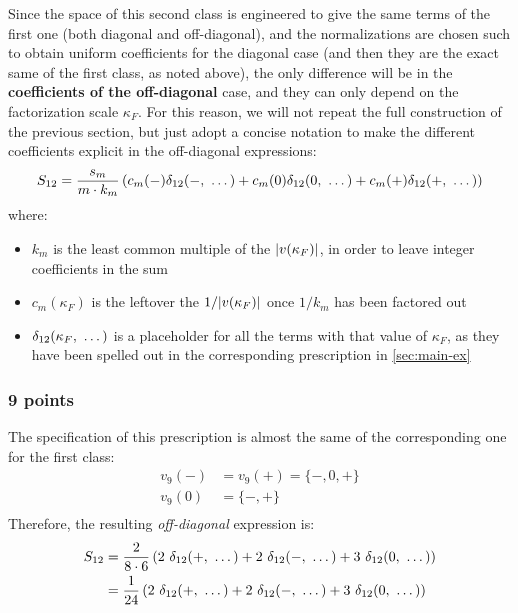 Since the space of this second class is engineered to give the same terms of
the first one (both diagonal and off-diagonal), and the normalizations are
chosen such to obtain uniform coefficients for the diagonal case (and then they
are the exact same of the first class, as noted above), the only difference
will be in the \textbf{coefficients of the off-diagonal} case, and they can
only depend on the factorization scale $\kappa_F$.
For this reason, we will not repeat the full construction of the previous
section, but just adopt a concise notation to make the different coefficients
explicit in the off-diagonal expressions:
\begin{equation}
    S_{12} = \frac{s_m}{m \cdot k_m} \left(c_m(-) \delta_{12}(-,\ \dots) +
        c_m(0) \delta_{12}(0,\ \dots) + c_m(+) \delta_{12}(+,\ \dots)\right)
\end{equation}
where:
\begin{itemize}
    \item $k_m$ is the least common multiple of the $\abs{v(\kappa_F)}$, in
        order to leave integer coefficients in the sum
    \item $c_m(\kappa_F)$ is the leftover the $1/\abs{v(\kappa_F)}$ once
        $1/k_m$ has been factored out
    \item $\delta_{12}(\kappa_F,\ \dots)$ is a placeholder for all the terms with that
        value of $\kappa_F$, as they have been spelled out in the corresponding
        prescription in \cref{sec:main-ex}
\end{itemize}

\subsubsection{9 points}

The specification of this prescription is almost the same of the corresponding
one for the first class:
\begin{align}
    \label{eq:5specs-slices}
    v_9(-) &= v_9(+) = \{-, 0, +\}\\
    v_9(0) &= \{-, +\}\\
\end{align}
Therefore, the resulting \textit{off-diagonal} expression is:
\begin{align}
    S_{12} &= \frac{2}{8 \cdot 6} \left(2\ \deltagroup{+} + 2\ \deltagroup{-} + 3\ \deltagroup{0}\right)\\
        &= \frac{1}{24} \left(2\ \deltagroup{+} + 2\ \deltagroup{-} + 3\ \deltagroup{0}\right)
\end{align}


